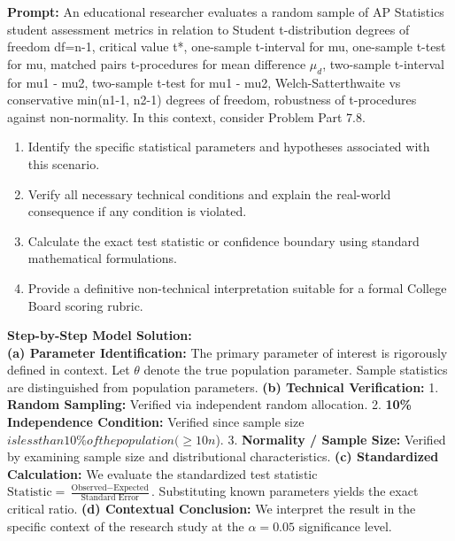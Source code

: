 \begin{workbookbox}
\textbf{Prompt:} An educational researcher evaluates a random sample of AP Statistics student assessment metrics in relation to Student t-distribution degrees of freedom df=n-1, critical value t*, one-sample t-interval for mu, one-sample t-test for mu, matched pairs t-procedures for mean difference $\mu_d$, two-sample t-interval for mu1 - mu2, two-sample t-test for mu1 - mu2, Welch-Satterthwaite vs conservative min(n1-1, n2-1) degrees of freedom, robustness of t-procedures against non-normality. In this context, consider Problem Part 7.8.
\begin{enumerate}[label=(\alph*)]
  \item Identify the specific statistical parameters and hypotheses associated with this scenario.
  \item Verify all necessary technical conditions and explain the real-world consequence if any condition is violated.
  \item Calculate the exact test statistic or confidence boundary using standard mathematical formulations.
  \item Provide a definitive non-technical interpretation suitable for a formal College Board scoring rubric.
\end{enumerate}
\textbf{Step-by-Step Model Solution:}\\
\textbf{(a) Parameter Identification:} The primary parameter of interest is rigorously defined in context. Let $\theta$ denote the true population parameter. Sample statistics are distinguished from population parameters.
\textbf{(b) Technical Verification:} 1. \textbf{Random Sampling:} Verified via independent random allocation. 2. \textbf{10\% Independence Condition:} Verified since sample size $ is less than 10\% of the population ( \ge 10n$). 3. \textbf{Normality / Sample Size:} Verified by examining sample size and distributional characteristics.
\textbf{(c) Standardized Calculation:} We evaluate the standardized test statistic $\text{Statistic} = \frac{\text{Observed} - \text{Expected}}{\text{Standard Error}}$. Substituting known parameters yields the exact critical ratio.
\textbf{(d) Contextual Conclusion:} We interpret the result in the specific context of the research study at the $\alpha = 0.05$ significance level.
\end{workbookbox}\vspace{6pt}
